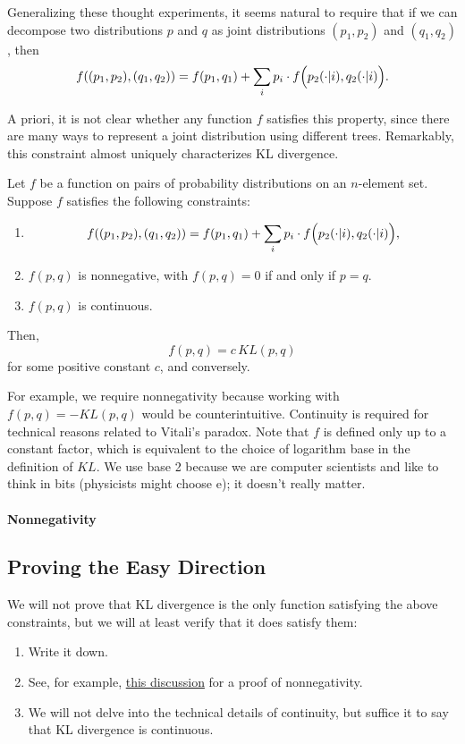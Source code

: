 \documentclass{article}
\begin{document}
Generalizing these thought experiments, it seems natural to require that if we can decompose two distributions \(p\) and \(q\) as joint distributions \((p_1,p_2)\) and \((q_1,q_2)\), then
\[
f((p_1, p_2), (q_1, q_2)) = f(p_1, q_1) + \sum_i p_i\cdot f\Bigl(p_2(\cdot|i), q_2(\cdot|i)\Bigr).
\]

A priori, it is not clear whether any function \(f\) satisfies this property, since there are many ways to represent a joint distribution using different trees. Remarkably, this constraint almost uniquely characterizes KL divergence.

\begin{theorem}
    Let \(f\) be a function on pairs of probability distributions on an \(n\)-element set. Suppose \(f\) satisfies the following constraints:
    \begin{enumerate}
        \item 
        \[
        f((p_1, p_2), (q_1, q_2)) = f(p_1, q_1) + \sum_i p_i\cdot f\Bigl(p_2(\cdot|i), q_2(\cdot|i)\Bigr),
        \]
        \item \(f(p,q)\) is nonnegative, with \(f(p,q)=0\) if and only if \(p=q\).
        \item \(f(p,q)\) is continuous. 
    \end{enumerate}
    Then,
    \[
    f(p,q) = c\, KL(p,q)
    \]
    for some positive constant \(c\), and conversely.
\end{theorem}

For example, we require nonnegativity because working with \(f(p,q) = -KL(p,q)\) would be counterintuitive. Continuity is required for technical reasons related to Vitali's paradox. Note that \(f\) is defined only up to a constant factor, which is equivalent to the choice of logarithm base in the definition of \(KL\). We use base 2 because we are computer scientists and like to think in bits (physicists might choose \(\mathrm{e}\)); it doesn't really matter.

\paragraph{Nonnegativity}



\subsection{Proving the Easy Direction}

We will not prove that KL divergence is the only function satisfying the above constraints, but we will at least verify that it does satisfy them:
\begin{enumerate}
    \item Write it down.
    \item See, for example, \href{https://stats.stackexchange.com/questions/335197/why-kl-divergence-is-non-negative}{this discussion} for a proof of nonnegativity.
    \item We will not delve into the technical details of continuity, but suffice it to say that KL divergence is continuous.
\end{enumerate}
\end{document}
